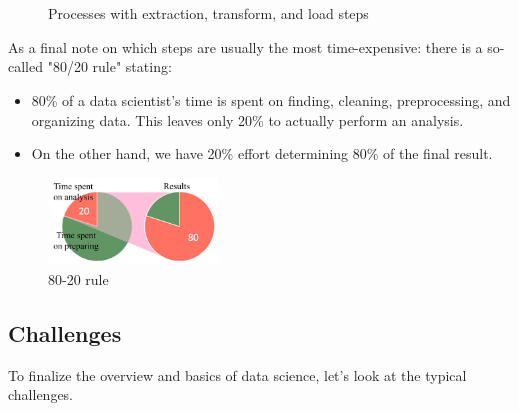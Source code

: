 \begin{figure}[H]
  \centering

  \\\hspace*{0.5cm}\\

  \caption{Processes with extraction, transform, and load steps}
  \label{fig:1_etl_and_elt}
\end{figure}

As a final note on which steps are usually the most time-expensive: there is a so-called "80/20 rule" stating:
\begin{itemize}
  \item 80\% of a data scientist's time is spent on finding, cleaning, preprocessing, and organizing data. This leaves only 20\% to actually perform an analysis.
  \item On the other hand, we have 20\% effort determining 80\% of the final result.
\end{itemize}

\begin{figure}[H]
  \centering
  \includegraphics[width=0.4\textwidth]{assets/basics/80_20.png}
  \caption{80-20 rule}
  \label{fig:1_80_20}
\end{figure}


\subsection{Challenges}
To finalize the overview and basics of data science, let's look at the typical challenges.

